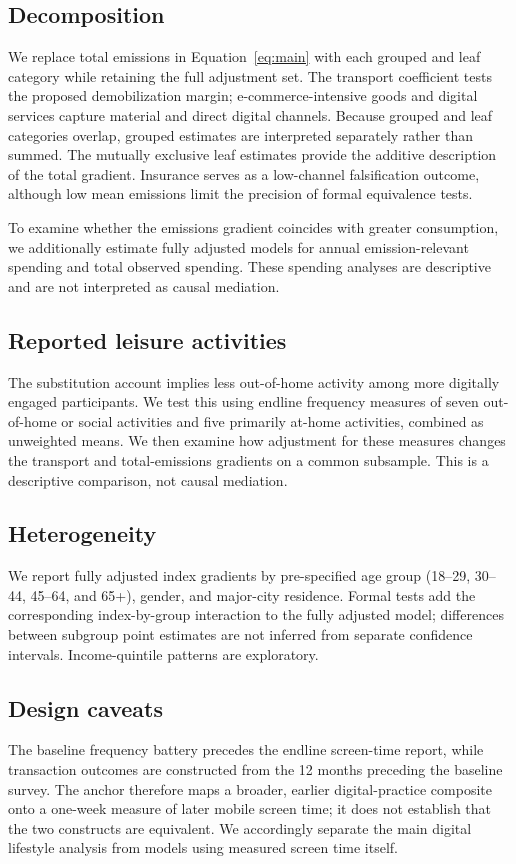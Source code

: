 \documentclass[11pt,a4paper]{article}
\begin{document}
\subsection{Decomposition}
We replace total emissions in Equation~\ref{eq:main} with each grouped and leaf
category while retaining the full adjustment set. The transport coefficient tests
the proposed demobilization margin; e-commerce-intensive goods and digital
services capture material and direct digital channels. Because grouped and leaf
categories overlap, grouped estimates are interpreted separately rather than
summed. The mutually exclusive leaf estimates provide the additive description
of the total gradient. Insurance serves as a low-channel falsification outcome,
although low mean emissions limit the precision of formal equivalence tests.

To examine whether the emissions gradient coincides with greater consumption,
we additionally estimate fully adjusted models for annual emission-relevant spending and
total observed spending. These spending analyses are descriptive and are not
interpreted as causal mediation.

\subsection{Reported leisure activities}
The substitution account implies less out-of-home activity among more digitally
engaged participants. We test this using endline frequency measures of seven
out-of-home or social activities and five primarily at-home activities, combined
as unweighted means. We then examine how adjustment for these measures changes
the transport and total-emissions gradients on a common subsample. This is a
descriptive comparison, not causal mediation.

\subsection{Heterogeneity}
We report fully adjusted index gradients by pre-specified age group
(18--29, 30--44, 45--64, and 65+), gender, and major-city residence. Formal
tests add the corresponding index-by-group interaction to the fully adjusted model; differences
between subgroup point estimates are not inferred from separate confidence
intervals. Income-quintile patterns are exploratory.

\subsection{Design caveats}
The baseline frequency battery precedes the endline screen-time report, while
transaction outcomes are constructed from the 12 months preceding the baseline
survey. The anchor therefore maps a broader, earlier digital-practice composite
onto a one-week measure of later mobile screen time; it does not establish that
the two constructs are equivalent. We accordingly separate the main digital
lifestyle analysis from models using measured screen time itself.
\end{document}

